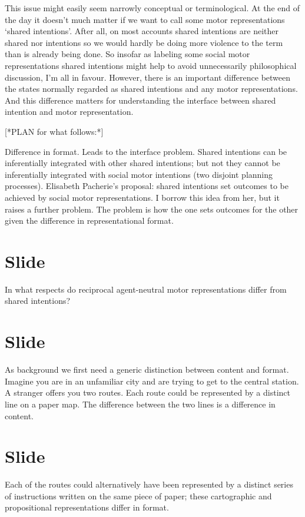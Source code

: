 \documentclass[12pt,\papersize]{extarticle}
\begin{document}
This issue might easily seem narrowly conceptual or terminological.  
At the end of the day it doesn’t much matter if we want to call some motor representations ‘shared intentions’.  
After all, on most accounts shared intentions are neither shared nor intentions so we would hardly be doing more violence to the term than is already being done.  
So insofar as labeling some social motor representations shared intentions might help to avoid unnecessarily philosophical discussion, I’m all in favour.
However, there is an important difference between the states normally regarded as  shared intentions and any motor representations.
And this difference matters for understanding the interface between shared intention and motor representation.


[*PLAN for what follows:*]

Difference in format.
Leads to the interface problem.  
Shared intentions can be inferentially integrated with other shared intentions; but not they cannot be inferentially integrated with social motor intentions (two disjoint planning processes).  
Elisabeth Pacherie’s proposal: shared intentions set outcomes to be achieved by social motor representations.  
I borrow this idea from her, but it raises a further problem.
The problem is how the one sets outcomes for the other given the difference in representational format.


\section{Slide}
In what respects do reciprocal agent-neutral motor representations differ from shared intentions?


\section{Slide}
As background we first need a generic distinction between content and format. Imagine you are in an unfamiliar city and are trying to get to the central station. A stranger offers you two routes. Each route could be represented by a distinct line on a paper map. The difference between the two lines is a difference in content. 


\section{Slide}
Each of the routes could alternatively have been represented by a distinct series of instructions written on the same piece of paper; these cartographic and propositional representations differ in format. 
\end{document}
